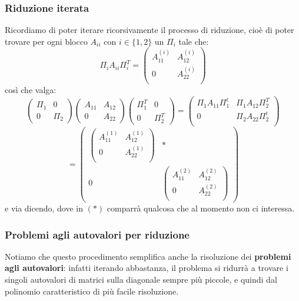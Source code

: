 \documentclass[a4paper,11pt]{article}
\begin{document}
\subsubsection{Riduzione iterata}
Ricordiamo di poter iterare ricorsivamente il processo di riduzione, cioè di poter trovare per ogni blocco $A_{ii}$ con $i \in \{ 1, 2 \}$ un $\Pi_i$ tale che:
$$
\Pi_i A_{ii} \Pi_i^T = \begin{pmatrix}
	A_{11}^{(i)} & A_{12}^{(i)} \\
	0 & A_{22}^{(i)} \\
\end{pmatrix}
$$
così che valga:
$$
\begin{pmatrix}
	\Pi_1 & 0 \\
	0 & \Pi_2
\end{pmatrix}
\begin{pmatrix}
	A_{11} & A_{12} \\
	0 & A_{22}
\end{pmatrix}
\begin{pmatrix}
	\Pi_1^T & 0 \\
	0 & \Pi_2^T
\end{pmatrix} =
\begin{pmatrix}
	\Pi_1 A_{11} \Pi_1^t & \Pi_1 A_{12} \Pi_2^T \\
	0 & \Pi_2 A_{22} \Pi_2^t \\
\end{pmatrix}
$$
$$
= \begin{pmatrix}
\begin{pmatrix}
	A_{11}^{(1)} & A_{12}^{(1)} \\
	0 & A_{22}^{(1)} \\
\end{pmatrix} & * \\
0 & 
\begin{pmatrix}
	A_{11}^{(2)} & A_{12}^{(2)} \\
	0 & A_{22}^{(2)} \\
\end{pmatrix}
\end{pmatrix}
$$
e via dicendo,
dove in $(*)$ comparrà qualcosa che al momento non ci interessa.

\subsubsection{Problemi agli autovalori per riduzione}
Notiamo che questo procedimento semplifica anche la risoluzione dei \textbf{problemi agli autovalori}: infatti iterando abbastanza, il problema si ridurrà a trovare i singoli autovalori di matrici sulla diagonale sempre più piccole, e quindi dal polinomio caratteristico di più facile risoluzione.
\end{document}
